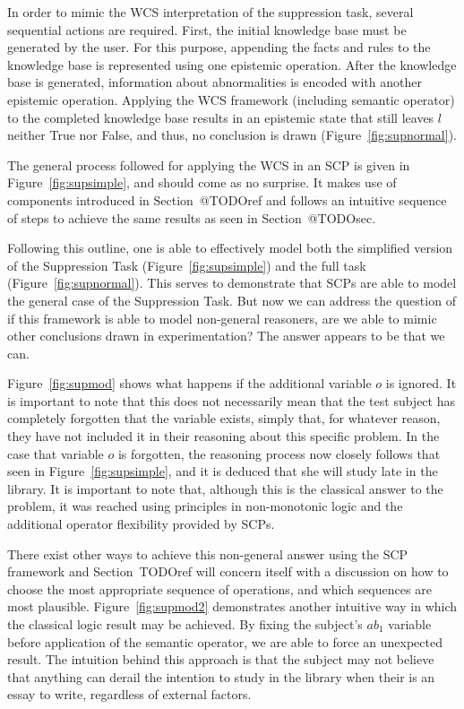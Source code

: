 \documentclass{article}
\begin{document}
In order to mimic the WCS interpretation of the suppression task, several sequential actions are required. First, the initial knowledge base must be generated by the user. For this purpose, appending the facts and rules to the knowledge base is represented using one epistemic operation. After the knowledge base is generated, information about abnormalities is encoded with another epistemic operation. Applying the WCS framework (including semantic operator) to the completed knowledge base results in an epistemic state that still leaves $l$ neither True nor False, and thus, no conclusion is drawn (Figure~\ref{fig:supnormal}).




The general process followed for applying the WCS in an SCP is given in Figure~\ref{fig:supsimple}, and should come as no surprise. It makes use of components introduced in Section~@TODOref and follows an intuitive sequence of steps to achieve the same results as seen in Section~@TODOsec.

Following this outline, one is able to effectively model both the simplified version of the Suppression Task (Figure~\ref{fig:supsimple}) and the full task (Figure~\ref{fig:supnormal}). This serves to demonstrate that SCPs are able to model the general case of the Suppression Task. But now we can address the question of if this framework is able to model non-general reasoners, are we able to mimic other conclusions drawn in experimentation? The answer appears to be that we can.

Figure~\ref{fig:supmod} shows what happens if the additional variable $o$ is ignored. It is important to note that this does not necessarily mean that the test subject has completely forgotten that the variable exists, simply that, for whatever reason, they have not included it in their reasoning about this specific problem. In the case that variable $o$ is forgotten, the reasoning process now closely follows that seen in Figure~\ref{fig:supsimple}, and it is deduced that she will study late in the library. It is important to note that, although this is the classical answer to the problem, it was reached using principles in non-monotonic logic and the additional operator flexibility provided by SCPs.

There exist other ways to achieve this non-general answer using the SCP framework and Section~TODOref will concern itself with a discussion on how to choose the most appropriate sequence of operations, and which sequences are most plausible. Figure~\ref{fig:supmod2} demonstrates another intuitive way in which the classical logic result may be achieved. By fixing the subject's $ab_1$ variable before application of the semantic operator, we are able to force an unexpected result. The intuition behind this approach is that the subject may not believe that anything can derail the intention to study in the library when their is an essay to write, regardless of external factors.
\end{document}
